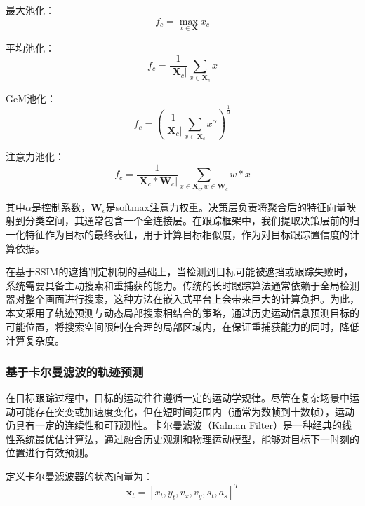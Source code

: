 最大池化：
\begin{equation}
    f_c=\max _{x \in \mathbf{X}} x_{c}
\end{equation}

平均池化：
\begin{equation}
    f_c=\frac{1}{\left|\mathbf{X}_c\right|} \sum_{x \in \mathbf{X}_c} x
\end{equation}

GeM池化：
\begin{equation}
    f_c=\left(\frac{1}{\left|\mathbf{X}_c\right|} \sum_{x \in \mathbf{X}_c} x^\alpha\right)^{\frac{1}{\alpha}}
\end{equation}

注意力池化：
\begin{equation}
    f_c=\frac{1}{\left|\mathbf{X}_c * \mathbf{W}_c\right|} \sum_{x \in \mathbf{X}_c, w \in \mathbf{W}_c} w * x
\end{equation}

其中$\alpha$是控制系数，$\mathbf{W}_{c}$是softmax注意力权重。决策层负责将聚合后的特征向量映射到分类空间，其通常包含一个全连接层。在跟踪框架中，我们提取决策层前的归一化特征作为目标的最终表征，用于计算目标相似度，作为对目标跟踪置信度的计算依据。



在基于SSIM的遮挡判定机制的基础上，当检测到目标可能被遮挡或跟踪失败时，系统需要具备主动搜索和重捕获的能力。传统的长时跟踪算法通常依赖于全局检测器对整个画面进行搜索，这种方法在嵌入式平台上会带来巨大的计算负担。为此，本文采用了轨迹预测与动态局部搜索相结合的策略，通过历史运动信息预测目标的可能位置，将搜索空间限制在合理的局部区域内，在保证重捕获能力的同时，降低计算复杂度。

\subsubsection{基于卡尔曼滤波的轨迹预测}

在目标跟踪过程中，目标的运动往往遵循一定的运动学规律。尽管在复杂场景中运动可能存在突变或加速度变化，但在短时间范围内（通常为数帧到十数帧），运动仍具有一定的连续性和可预测性。卡尔曼滤波（Kalman Filter）是一种经典的线性系统最优估计算法，通过融合历史观测和物理运动模型，能够对目标下一时刻的位置进行有效预测。

定义卡尔曼滤波器的状态向量为：
\begin{equation}
\mathbf{x}_t = [x_t, y_t, v_x, v_y, s_t, a_s]^T
\end{equation}


